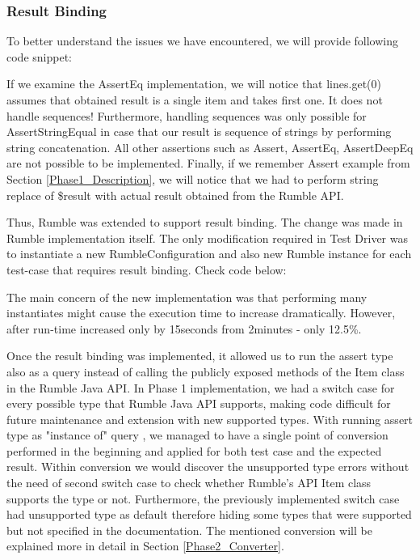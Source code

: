 \subsubsection{Result Binding}
To better understand the issues we have encountered, we will provide following code snippet:


If we examine the AssertEq implementation, we will notice that lines.get(0) assumes that obtained result is a single item and takes first one. It does not handle sequences! Furthermore, handling sequences was only possible for AssertStringEqual in case that our result is sequence of strings by performing string concatenation. All other assertions such as Assert, AssertEq, AssertDeepEq are not possible to be implemented. Finally, if we remember Assert example from Section \ref{Phase1_Description}, we will notice that we had to perform string replace of \$result with actual result obtained from the Rumble API. 

Thus, Rumble was extended to support result binding. The change was made in Rumble implementation itself. The only modification required in Test Driver was to instantiate a new RumbleConfiguration and also new Rumble instance for each test-case that requires result binding. Check code below:



The main concern of the new implementation was that performing many instantiates might cause the execution time to increase dramatically. However, after run-time increased only by 15seconds from 2minutes - only 12.5\%.

Once the result binding was implemented, it allowed us to run the assert type also as a query instead of calling the publicly exposed methods of the Item class in the Rumble Java API. In Phase 1 implementation, we had a switch case for every possible type that Rumble Java API supports, making code difficult for future maintenance and extension with new supported types. With running assert type as "instance of" query , we managed to have a single point of conversion performed in the beginning and applied for both test case and the expected result. Within conversion we would discover the unsupported type errors without the need of second switch case to check whether Rumble's API Item class supports the type or not. Furthermore, the previously implemented switch case had unsupported type as default therefore hiding some types that were supported but not specified in the documentation. The mentioned conversion will be explained more in detail in Section \ref{Phase2_Converter}. 

